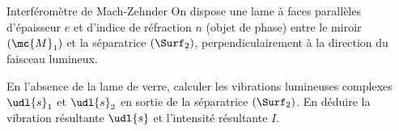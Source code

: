 \begin{exo}[PC][3][TD]{Interféromètre de Mach-Zehnder}
On dispose une lame à faces parallèles d'épaisseur $e$ et d'indice de réfraction $n$ (objet de phase) entre le miroir $(\mc{M}_1)$ et la séparatrice $(\Surf_2)$, perpendiculairement à la direction du faisceau lumineux. 
\begin{quest}
  \item En l'absence de la lame de verre, calculer les vibrations lumineuses complexes $\udl{s}_1$ et $\udl{s}_2$ en sortie de la séparatrice $(\Surf_2)$. En déduire la vibration résultante $\udl{s}$ et l'intensité résultante $I$.
\end{quest}
\end{exo}
